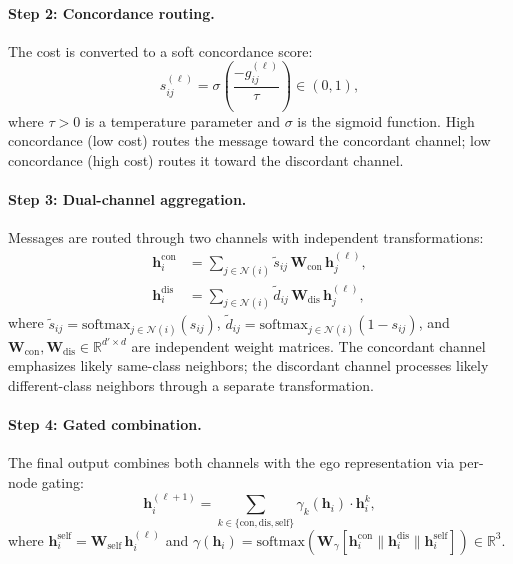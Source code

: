 \documentclass[runningheads]{llncs}
\newcommand{\R}{\mathbb{R}}
\newcommand{\N}{\mathcal{N}}
\newcommand{\bW}{\mathbf{W}}
\newcommand{\bh}{\mathbf{h}}
\begin{document}
\paragraph{Step 2: Concordance routing.}
The cost is converted to a soft concordance score:
\begin{equation}\label{eq:concordance}
    s_{ij}^{(\ell)} = \sigma\!\left(\frac{-g_{ij}^{(\ell)}}{\tau}\right) \in (0, 1),
\end{equation}
where $\tau > 0$ is a temperature parameter and $\sigma$ is the sigmoid function.
High concordance (low cost) routes the message toward the concordant channel; low concordance (high cost) routes it toward the discordant channel.

\paragraph{Step 3: Dual-channel aggregation.}
Messages are routed through two channels with independent transformations:
\begin{align}
    \bh_i^{\text{con}} &= \sum_{j \in \N(i)} \tilde{s}_{ij}\, \bW_{\text{con}}\, \bh_j^{(\ell)}, \label{eq:con}\\
    \bh_i^{\text{dis}} &= \sum_{j \in \N(i)} \tilde{d}_{ij}\, \bW_{\text{dis}}\, \bh_j^{(\ell)}, \label{eq:dis}
\end{align}
where $\tilde{s}_{ij} = \mathrm{softmax}_{j \in \N(i)}(s_{ij})$, $\tilde{d}_{ij} = \mathrm{softmax}_{j \in \N(i)}(1 - s_{ij})$, and $\bW_{\text{con}}, \bW_{\text{dis}} \in \R^{d' \times d}$ are independent weight matrices.
The concordant channel emphasizes likely same-class neighbors; the discordant channel processes likely different-class neighbors through a separate transformation.

\paragraph{Step 4: Gated combination.}
The final output combines both channels with the ego representation via per-node gating:
\begin{equation}\label{eq:gate}
    \bh_i^{(\ell+1)} = \sum_{k \in \{\text{con}, \text{dis}, \text{self}\}} \gamma_k(\bh_i) \cdot \bh_i^{k},
\end{equation}
where $\bh_i^{\text{self}} = \bW_{\text{self}}\, \bh_i^{(\ell)}$ and $\gamma(\bh_i) = \mathrm{softmax}(\bW_\gamma [\bh_i^{\text{con}} \| \bh_i^{\text{dis}} \| \bh_i^{\text{self}}]) \in \R^3$.
\end{document}

